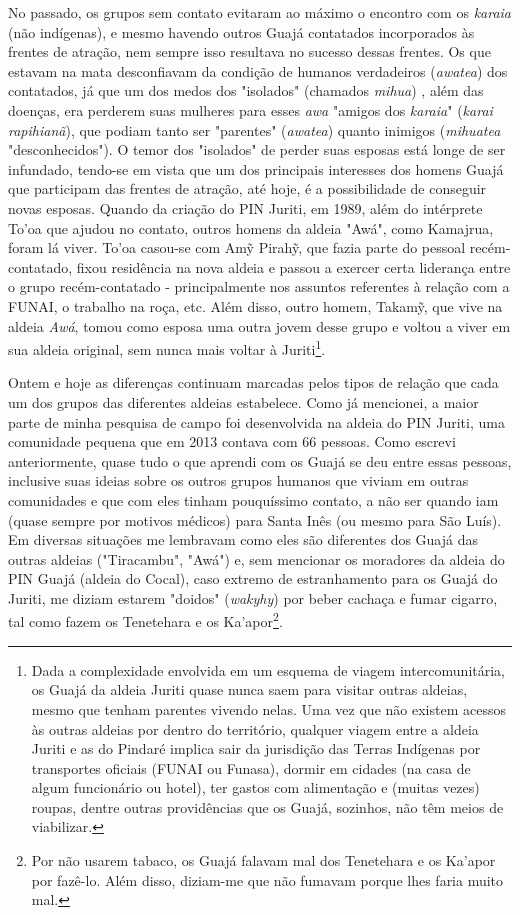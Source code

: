 No passado, os grupos sem contato evitaram ao máximo o encontro com os
\emph{karaia} (não indígenas), e mesmo havendo outros Guajá contatados
incorporados às frentes de atração, nem sempre isso resultava no sucesso
dessas frentes. Os que estavam na mata desconfiavam da condição de
humanos verdadeiros (\emph{awatea}) dos contatados, já que um dos medos
dos "isolados" (chamados \emph{mihua}) , além das doenças, era perderem
suas mulheres para esses \emph{awa} "amigos dos \emph{karaia}"
(\emph{karai rapihianã}), que podiam tanto ser "parentes"
(\emph{awatea}) quanto inimigos (\emph{mihuatea} "desconhecidos"). O
temor dos "isolados" de perder suas esposas está longe de ser infundado,
tendo-se em vista que um dos principais interesses dos homens Guajá que
participam das frentes de atração, até hoje, é a possibilidade de
conseguir novas esposas. Quando da criação do PIN Juriti, em 1989, além
do intérprete To'oa que ajudou no contato, outros homens da aldeia
"Awá", como Kamajrua, foram lá viver. To'oa casou-se com Amỹ Pirahỹ, que
fazia parte do pessoal recém-contatado, fixou residência na nova aldeia
e passou a exercer certa liderança entre o grupo recém-contatado -
principalmente nos assuntos referentes à relação com a FUNAI, o trabalho
na roça, etc. Além disso, outro homem, Takamỹ, que vive na aldeia
\emph{Awá}, tomou como esposa uma outra jovem desse grupo e voltou a
viver em sua aldeia original, sem nunca mais voltar à Juriti\footnote{Dada
  a complexidade envolvida em um esquema de viagem intercomunitária, os
  Guajá da aldeia Juriti quase nunca saem para visitar outras aldeias,
  mesmo que tenham parentes vivendo nelas. Uma vez que não existem
  acessos às outras aldeias por dentro do território, qualquer viagem
  entre a aldeia Juriti e as do Pindaré implica sair da jurisdição das
  Terras Indígenas por transportes oficiais (FUNAI ou Funasa), dormir em
  cidades (na casa de algum funcionário ou hotel), ter gastos com
  alimentação e (muitas vezes) roupas, dentre outras providências que os
  Guajá, sozinhos, não têm meios de viabilizar.}.

Ontem e hoje as diferenças continuam marcadas pelos tipos de relação que
cada um dos grupos das diferentes aldeias estabelece. Como já mencionei,
a maior parte de minha pesquisa de campo foi desenvolvida na aldeia do
PIN Juriti, uma comunidade pequena que em 2013 contava com 66 pessoas.
Como escrevi anteriormente, quase tudo o que aprendi com os Guajá se deu
entre essas pessoas, inclusive suas ideias sobre os outros grupos
humanos que viviam em outras comunidades e que com eles tinham
pouquíssimo contato, a não ser quando iam (quase sempre por motivos
médicos) para Santa Inês (ou mesmo para São Luís). Em diversas situações
me lembravam como eles são diferentes dos Guajá das outras aldeias
("Tiracambu", "Awá") e, sem mencionar os moradores da aldeia do PIN
Guajá (aldeia do Cocal), caso extremo de estranhamento para os Guajá do
Juriti, me diziam estarem "doidos" (\emph{wakyhy}) por beber cachaça e
fumar cigarro, tal como fazem os Tenetehara e os Ka'apor\footnote{Por
  não usarem tabaco, os Guajá falavam mal dos Tenetehara e os Ka'apor
  por fazê-lo. Além disso, diziam-me que não fumavam porque lhes faria
  muito mal.}.

